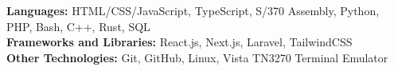 

\begin{cvparagraph}

\textbf{Languages:} HTML/CSS/JavaScript, TypeScript, S/370 Assembly, Python, PHP, Bash, C++, Rust, SQL \\
\textbf{Frameworks and Libraries:} React.js, Next.js, Laravel, TailwindCSS \\
\textbf{Other Technologies:} Git, GitHub, Linux, Vista TN3270 Terminal Emulator
    
\end{cvparagraph}
